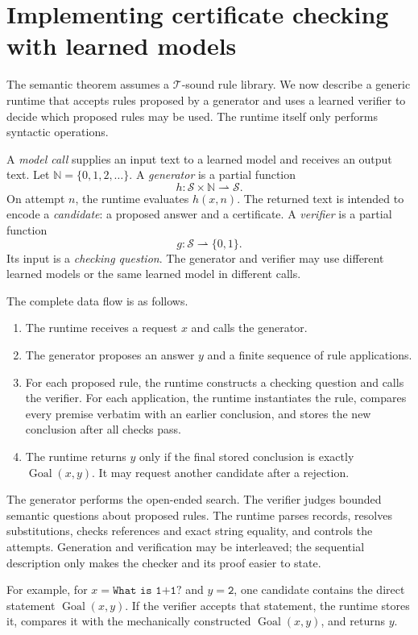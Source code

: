 \documentclass[11pt,twoside]{article}
\theoremstyle{definition}
\newcommand{\Stext}{\mathcal S}
\newcommand{\True}{\mathcal T}
\newcommand{\Goal}{\operatorname{Goal}}
\begin{document}
\section{Implementing certificate checking with learned models}
\label{sec:learned-runtime}

The semantic theorem assumes a $\True$-sound rule library. We now describe a
generic runtime that accepts rules proposed by a generator and uses a learned
verifier to decide which proposed rules may be used. The runtime itself only
performs syntactic operations.

A \emph{model call} supplies an input text to a learned model and receives an
output text. Let $\mathbb N=\{0,1,2,\ldots\}$. A \emph{generator} is a partial
function
\[
 h:\Stext\times\mathbb N\rightharpoonup\Stext.
\]
On attempt $n$, the runtime evaluates $h(x,n)$. The returned text is intended
to encode a \emph{candidate}: a proposed answer and a certificate. A
\emph{verifier} is a partial function
\[
 g:\Stext\rightharpoonup\{0,1\}.
\]
Its input is a \emph{checking question}. The generator and verifier may use
different learned models or the same learned model in different calls.

The complete data flow is as follows.
\begin{enumerate}[leftmargin=*]
\item The runtime receives a request $x$ and calls the generator.
\item The generator proposes an answer $y$ and a finite sequence of rule
applications.
\item For each proposed rule, the runtime constructs a checking question and
calls the verifier. For each application, the runtime instantiates the rule,
compares every premise verbatim with an earlier conclusion, and stores the new
conclusion after all checks pass.
\item The runtime returns $y$ only if the final stored conclusion is exactly
$\Goal(x,y)$. It may request another candidate after a rejection.
\end{enumerate}

The generator performs the open-ended search. The verifier judges bounded
semantic questions about proposed rules. The runtime parses records, resolves
substitutions, checks references and exact string equality, and controls the
attempts. Generation and verification may be interleaved; the sequential
description only makes the checker and its proof easier to state.

For example, for $x=\texttt{What is 1+1?}$ and $y=\texttt{2}$, one candidate
contains the direct statement $\Goal(x,y)$. If the verifier accepts that
statement, the runtime stores it, compares it with the mechanically
constructed $\Goal(x,y)$, and returns $y$.
\end{document}
